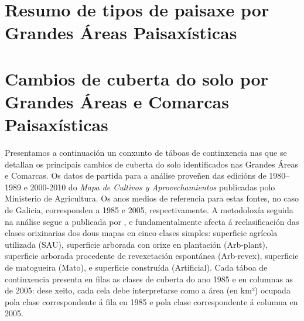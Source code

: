 \documentclass[11pt,a4paper]{article}
\begin{document}



\newpage
\section*{Resumo de tipos de paisaxe por Grandes Áreas Paisaxísticas}

\begin{landscape}
 \begin{small}
  
  
 \end{small}
\clearpage
\end{landscape}


\section*{Cambios de cuberta do solo por Grandes Áreas e Comarcas Paisaxísticas}

Presentamos a continuación un conxunto de táboas de continxencia nas que se detallan os principais cambios de cuberta do solo identificados nas Grandes Áreas e Comarcas. Os datos de partida para a análise proveñen das edicións de 1980--1989 e 2000-2010 do \emph{Mapa de Cultivos y Aprovechamientos} publicadas polo Ministerio de Agricultura. Os anos medios de referencia para estas fontes, no caso de Galicia, corresponden a 1985 e 2005, respectivamente. A metodoloxía seguida na análise segue a publicada por \citet{Corbelle2014RGE}, e fundamentalmente afecta á reclasificación das clases orixinarias dos dous mapas en cinco clases simples: superficie agrícola utilizada (SAU), superficie arborada con orixe en plantación (Arb-plant), superficie arborada procedente de revexetación espontánea (Arb-revex), superficie de matogueira (Mato), e superficie construída (Artificial). Cada táboa de continxencia presenta en filas as clases de cuberta do ano 1985 e en columnas as de 2005: dese xeito, cada cela debe interpretarse como a área (en km²) ocupada pola clase correspondente á fila en 1985 e pola clase correspondente á columna en 2005.

\clearpage

\begin{small}

%
\end{small}
\end{document}
